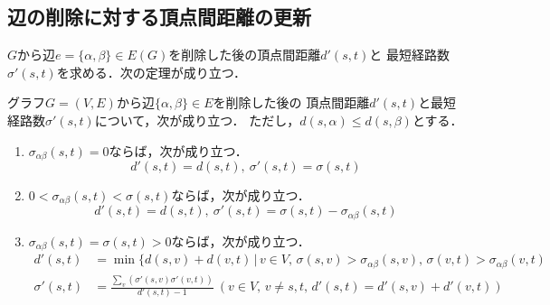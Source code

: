 \subsection*{辺の削除に対する頂点間距離の更新}
$G$から辺$e=\{\alpha,\beta\}\in E(G)$を削除した後の頂点間距離$d'(s,t)$と
最短経路数$\sigma'(s,t)$を求める．次の定理が成り立つ．
\begin{theorem}
  \label{thm:update-distance-on-delete}
  グラフ$G=(V,E)$から辺$\{\alpha,\beta\}\in E$を削除した後の
  頂点間距離$d'(s,t)$と最短経路数$\sigma'(s,t)$について，次が成り立つ．
  ただし，$d(s,\alpha)\leq d(s,\beta)$とする．
  \begin{enumerate}
  \item $\sigma_{\alpha\beta}(s,t)=0$ならば，次が成り立つ．
    \[ d'(s,t)=d(s,t),\:\sigma'(s,t)=\sigma(s,t) \]
  \item $0<\sigma_{\alpha\beta}(s,t)<\sigma(s,t)$ならば，次が成り立つ．
    \[ d'(s,t)=d(s,t),\:\sigma'(s,t)=\sigma(s,t)-\sigma_{\alpha\beta}(s,t) \]
  \item $\sigma_{\alpha\beta}(s,t)=\sigma(s,t)>0$ならば，次が成り立つ．
    \begin{equation*}
      \begin{aligned}
        d'(s,t)&=\min\{d(s,v)+d(v,t)\,|\,v\in V,\,
        \sigma(s,v)>\sigma_{\alpha\beta}(s,v),\,
        \sigma(v,t)>\sigma_{\alpha\beta}(v,t) \\
        \sigma'(s,t)&=\frac{\sum_v(\sigma'(s,v)\sigma'(v,t))}{d'(s,t)-1}\:
        (v\in V,\,v\neq s,t,\,d'(s,t)=d'(s,v)+d'(v,t))
      \end{aligned}
    \end{equation*}
  \end{enumerate}
\end{theorem}
